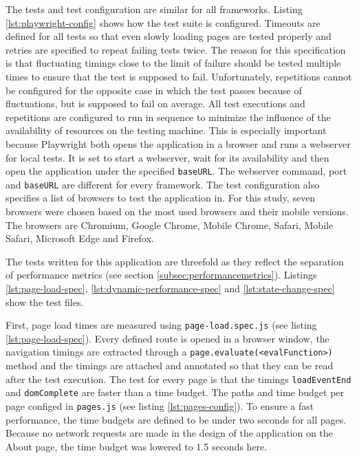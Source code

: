 \documentclass[a4paper, 12pt]{article}
\begin{document}
\vspace{1cm}

The tests and test configuration are similar for all frameworks.
Listing \ref{lst:playwright-config} shows how the test suite is configured.
Timeouts are defined for all tests so that even slowly loading pages are tested properly and retries are specified to repeat failing tests twice.
The reason for this specification is that fluctuating timings close to the limit of failure should be tested multiple times to ensure that the test is supposed to fail.
Unfortunately, repetitions cannot be configured for the opposite case in which the test passes because of fluctuations, but is supposed to fail on average.
All test executions and repetitions are configured to run in sequence to minimize the influence of the availability of resources on the testing machine.
This is especially important because Playwright both opens the application in a browser and runs a webserver for local tests.
It is set to start a webserver, wait for its availability and then open the application under the specified \verb|baseURL|.
The webserver command, port and \verb|baseURL| are different for every framework.
The test configuration also specifies a list of browsers to test the application in.
For this study, seven browsers were chosen based on the most used browsers \citep{browserUsage} and their mobile versions.
The browsers are Chromium, Google Chrome, Mobile Chrome, Safari, Mobile Safari, Microsoft Edge and Firefox.

The tests written for this application are threefold as they reflect the separation of performance metrics (see section \ref{subsec:performancemetrics}).
Listings \ref{lst:page-load-spec}, \ref{lst:dynamic-performance-spec} and \ref{lst:state-change-spec} show the test files.

First, page load times are measured using \verb|page-load.spec.js| (see listing \ref{lst:page-load-spec}).
Every defined route is opened in a browser window, the navigation timings are extracted through a \verb|page.evaluate(<evalFunction>)| method and the timings are attached and annotated so that they can be read after the test execution.
The test for every page is that the timings \verb|loadEventEnd| and \verb|domComplete| are faster than a time budget.
The paths and time budget per page configed in \verb|pages.js| (see listing \ref{lst:pages-config}).
To ensure a fast performance, the time budgets are defined to be under two seconds for all pages.
Because no network requests are made in the design of the application on the About page, the time budget was lowered to 1.5 seconds here.
\end{document}
